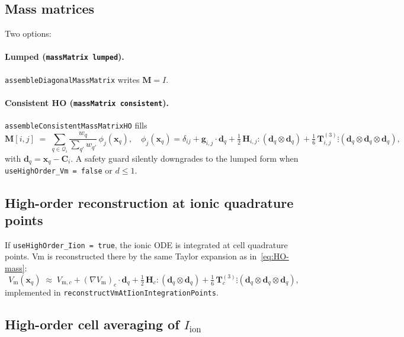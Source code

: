 \documentclass[11pt,a4paper]{article}
\newcommand{\code}[1]{\texttt{\small #1}}
\newcommand{\Vm}{V_{\text{m}}}
\newcommand{\Iion}{I_{\mathrm{ion}}}
\newcommand{\grad}{\nabla}
\newcommand{\Mmass}{\mathbf{M}}
\newcommand{\Vmsub}[1]{V_{\text{m},#1}}
\begin{document}
\subsection{Mass matrices}

Two options:
\paragraph{Lumped (\code{massMatrix lumped}).}
\code{assembleDiagonalMassMatrix} writes $\Mmass = I$.

\paragraph{Consistent HO (\code{massMatrix consistent}).}
\code{assembleConsistentMassMatrixHO} fills
\begin{equation}
  \Mmass[i, j] \;=\;
   \sum_{q \in \mathcal{Q}_{i}}
       \frac{w_{q}}{\sum_{q'} w_{q'}}\,
       \phi_{j}(\mathbf{x}_{q}),
   \quad
   \phi_{j}(\mathbf{x}_{q})
    = \delta_{ij}
    + \mathbf{g}_{i,j} \cdot \mathbf{d}_{q}
    + \tfrac{1}{2}\, \mathbf{H}_{i,j} \!:\! (\mathbf{d}_{q} \otimes \mathbf{d}_{q})
    + \tfrac{1}{6}\, \mathbf{T}^{(3)}_{i,j} \!\vdots\!
        (\mathbf{d}_{q} \otimes \mathbf{d}_{q} \otimes \mathbf{d}_{q}),
   \label{eq:HO-mass}
\end{equation}
with $\mathbf{d}_{q} = \mathbf{x}_{q} - \mathbf{C}_{i}$. A safety guard
silently downgrades to the lumped form when
\code{useHighOrder\_Vm = false} or $d \le 1$.

\subsection{High-order reconstruction at ionic quadrature points}

If \code{useHighOrder\_Iion = true}, the ionic ODE is integrated at
cell quadrature points. Vm is reconstructed there by the same Taylor
expansion as in~\eqref{eq:HO-mass}:
\begin{equation}
  \Vm(\mathbf{x}_{q})
   \;\approx\;
   \Vmsub{c} + (\grad \Vm)_{c} \cdot \mathbf{d}_{q}
   + \tfrac{1}{2}\, \mathbf{H}_{c} \!:\! (\mathbf{d}_{q} \otimes \mathbf{d}_{q})
   + \tfrac{1}{6}\, \mathbf{T}^{(3)}_{c} \!\vdots\!
       (\mathbf{d}_{q} \otimes \mathbf{d}_{q} \otimes \mathbf{d}_{q}),
   \label{eq:HO-vm}
\end{equation}
implemented in \code{reconstructVmAtIionIntegrationPoints}.

\subsection{High-order cell averaging of $\Iion$}
\end{document}
